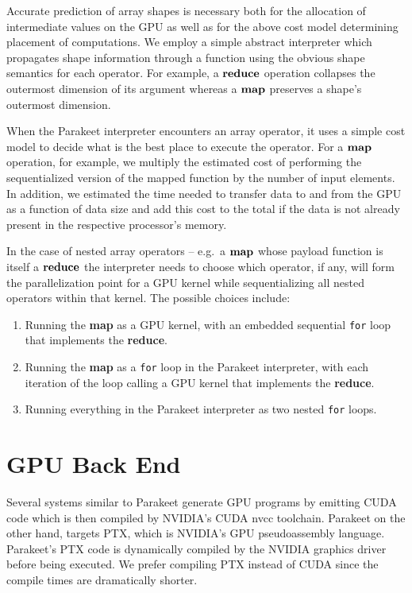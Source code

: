 \documentclass[10pt,twocolumn]{article}
\begin{document}
Accurate prediction of array shapes is necessary both for the allocation of intermediate values on the GPU as well as for the above cost model determining placement of computations. We employ a simple abstract interpreter which propagates shape information through a function using the obvious shape semantics for each operator. For example, a $\mbox{\textbf{reduce}}$ operation collapses the outermost dimension of its argument whereas a $\mbox{\textbf{map}}$ preserves a shape's outermost dimension.

When the Parakeet interpreter encounters an array operator, it uses a simple cost model to decide what is the best place to execute the operator.  For a $\mbox{\textbf{map}}$ operation, for example, we multiply the estimated cost of performing the sequentialized version of the mapped function by the number of input elements. In addition, we estimated the time needed to transfer data to and from the GPU as a function of data size and add this cost to the total if the data is not already present in the respective processor's memory.

In the case of nested array operators -- e.g.~a $\mbox{\textbf{map}}$ whose payload function is itself a $\mbox{\textbf{reduce}}$ the interpreter needs to choose which operator, if any, will form the parallelization point for a GPU kernel while sequentializing all nested operators within that kernel.  The possible choices include:

\begin{enumerate}
\item Running the \textbf{map} as a GPU kernel, with an embedded sequential \texttt{for} loop that implements the \textbf{reduce}.
\item Running the \textbf{map} as a \texttt{for} loop in the Parakeet interpreter, with each iteration of the loop calling a GPU kernel that implements the \textbf{reduce}.
\item Running everything in the Parakeet interpreter as two nested \texttt{for} loops.
\end{enumerate}



\section{GPU Back End}
Several systems similar to Parakeet \cite{Cata11,Chaf11} generate GPU programs by emitting CUDA code which is then compiled by NVIDIA's CUDA nvcc toolchain. Parakeet on the other hand, targets PTX, which is NVIDIA's GPU pseudoassembly language. Parakeet's PTX code is dynamically compiled by the NVIDIA graphics driver before being executed.  We prefer compiling PTX instead of CUDA since the compile times are dramatically shorter. 
\end{document}
